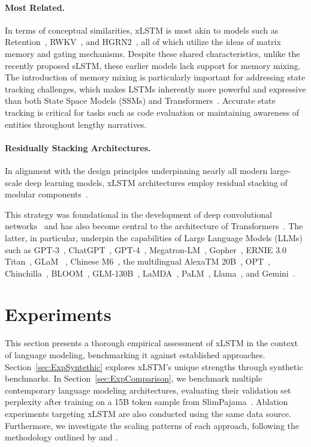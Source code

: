 \paragraph{Most Related.} In terms of conceptual similarities, xLSTM is most akin to models such as Retention~\citep{Sun:23arxiv}, RWKV~\citep{Peng:23arxivshort,Peng:24arxivshort}, and HGRN2~\citep{Qin:24arxiv}, all of which utilize the ideas of matrix memory and gating mechanisms. Despite these shared characteristics, unlike the recently proposed sLSTM, these earlier models lack support for memory mixing. The introduction of memory mixing is particularly important for addressing state tracking challenges, which makes LSTMs inherently more powerful and expressive than both State Space Models (SSMs) and Transformers~\citep{Merrill:24,Deletang:23}. Accurate state tracking is critical for tasks such as code evaluation or maintaining awareness of entities throughout lengthy narratives.

\paragraph{Residually Stacking Architectures.} In alignment with the design principles underpinning nearly all modern large-scale deep learning models, xLSTM architectures employ residual stacking of modular components~\citep{Srivastava:15,He:16}.

This strategy was foundational in the development of deep convolutional networks~\citep{He:16} and has also become central to the architecture of Transformers~\citep{Vaswani:17}. The latter, in particular, underpin the capabilities of Large Language Models (LLMs) such as GPT-3~\citep{Brown:20short}, ChatGPT~\citep{Schulman:22short}, GPT-4~\citep{Achiam:23gpt4short}, Megatron-LM~\citep{Shoeybi:19}, Gopher~\citep{Rae:21short}, ERNIE 3.0 Titan~\citep{Wang:21arxivshort}, GLaM ~\citep{Du:21glamshort}, Chinese M6~\citep{Lin:21}, the multilingual AlexaTM 20B~\citep{Soltan:22}, OPT~\citep{Zhang:22opt}, Chinchilla~\citep{Hoffmann:22short}, BLOOM~\citep{Scao:22arxivshort}, GLM-130B~\citep{Zeng:22arxivshort}, LaMDA~\citep{Thoppilan:22short}, PaLM~\citep{Chowdhery:22short}, Llama~\citep{Touvron:23arxiv}, and Gemini~\citep{GeminiTeam:23arxiv,Reid:24arxiv}.

\section{Experiments}
\label{sec:Exp}

This section presents a thorough empirical assessment of xLSTM in the context of language modeling, benchmarking it against established approaches. Section~\ref{sec:ExpSyntethic} explores xLSTM’s unique strengths through synthetic benchmarks. In Section~\ref{sec:ExpComparison}, we benchmark multiple contemporary language modeling architectures, evaluating their validation set perplexity after training on a 15B token sample from SlimPajama~\citep{Soboleva:23}. Ablation experiments targeting xLSTM are also conducted using the same data source. Furthermore, we investigate the scaling patterns of each approach, following the methodology outlined by \citet{Kaplan:20} and \citet{Brown:20short}.

